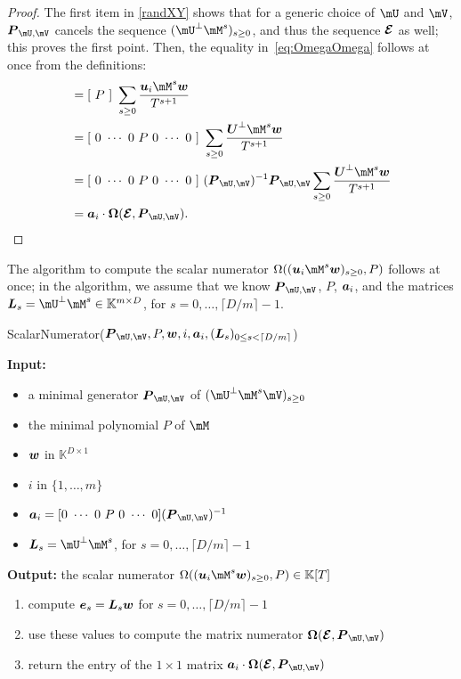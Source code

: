 \documentclass[12pt]{article}
\newcommand{\mat}[1]{\bm{\MakeUppercase{#1}}} %
\newcommand{\row}[1]{\bm{\MakeLowercase{#1}}} %
\newcommand{\col}[1]{\bm{\MakeLowercase{#1}}} %
\newcommand{\minpoly}{P}
\def\K{\mathbb{K}}
\def\K {\ensuremath{\mathbb{K}}}
\begin{document}
\begin{proof}
The first item in \cref{randXY} shows that for a generic choice of
$\mU$ and $\mV$, $\mat{P}_{\mU,\mV}$ cancels the sequence $(\mU^\perp
\mM^s)_{s \ge 0}$, and thus the sequence $\mat{\mathcal{E}}$ as well;
this proves the first point. Then, the equality
in~\eqref{eq:OmegaOmega} follows at once from the definitions:
\begin{align*}
[~ \Omega((\row{u}_i \mM^s \col{w})_{s \ge 0}, \minpoly)~]  &= [~\minpoly~]\ \sum_{s \ge 0} \frac{\row{u}_i \mM^s \col{w}}{T^{s+1}}\\
&=  [~0~\cdots~0~\minpoly~0~\cdots~0~]\  \sum_{s \ge 0} \frac{\mat{U}^\perp \mM^s \col{w}}{T^{s+1}}\\
&=  [~0~\cdots~0~\minpoly~0~\cdots~0~]\ (\mat{P}_{\mU,\mV})^{-1} \mat{P}_{\mU,\mV} \sum_{s \ge 0} \frac{\mat{U}^\perp \mM^s \col{w}}{T^{s+1}}\\
&=  \row{a}_i\cdot \mat{\Omega}(\mat{\mathcal{E}}, \mat{P}_{\mU,\mV}).
\end{align*}
\end{proof}

The algorithm to compute the scalar numerator $\Omega((\row{u}_i \mM^s
\col{w})_{s \ge 0}, \minpoly)$ follows at once; in the algorithm, we
assume that we know $\mat{P}_{\mU,\mV}$, $P$, $\row{a}_i$, and the
matrices $\mat{L}_s=\mU^\perp \mM^s \in \K^{m \times D}$, for
$s=0,\dots,\lceil D/m \rceil-1$.

\begin{algorithm}[H]
	\caption{ScalarNumerator($\mat{P}_{\mU,\mV}, \minpoly, \row{w}, i, \row{a}_i,(\mat{L}_s)_{0 \le s < \lceil D/m\rceil}$)}
	{\bf Input:} \vspace{-0.5em}
	\begin{itemize}
		\item a minimal generator $\mat{P}_{\mU,\mV}$ of $(\mU^\perp \mM^s \mV)_{s \ge 0}$
                \item the minimal polynomial $P$ of $\mM$
                \item $\row{w}$ in $\K^{D \times 1}$
                \item $i$ in $\{1,\dots,m\}$
                \item $\row{a}_i =  [0~\cdots~0~\minpoly~0~\cdots~0]  (\mat{P}_{\mU,\mV})^{-1} $
		\item $\mat{L}_s = \mU^\perp \mM^s$, for $s=0,\dots,\lceil D/m\rceil-1$
	\end{itemize}
	{\bf Output:} the scalar numerator $\Omega((\row{u}_i \mM^s \col{w})_{s \ge 0}, \minpoly) \in \K[T]$
        \begin{enumerate}[{\bf 1.}]
        \item compute $\col{E}_s = \mat{L}_s \col{w}$ for $s=0,\dots,\lceil D/m\rceil-1$
        \item use these values to compute the matrix numerator $ \mat{\Omega}(\mat{\mathcal{E}}, \mat{P}_{\mU,\mV})$ 
        \item return the entry of the $1 \times 1$ matrix $\row{a}_i\cdot  \mat{\Omega}(\mat{\mathcal{E}}, \mat{P}_{\mU,\mV})$ 
        \end{enumerate}
	\label{algo:block-sparse-fglm}
\end{algorithm}
\end{document}
